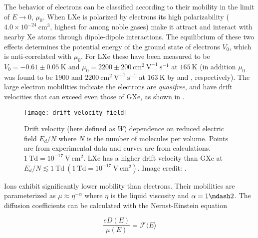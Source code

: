 The behavior of electrons can be classified according to their mobility in the limit of $E \rightarrow 0$, $\mu_0$.  When LXe is
polarized by electrons its high polarizability ($4.0 \times 10^{-24}\ \mathrm{cm^3}$, highest for among noble gases) make it
attract \electron and interact with nearby Xe atoms through dipole-dipole interactions.  The equilibrium of these two effects
determines the potential energy of the ground state of electrons $V_0$, which is anti-correlated with $\mu_0$.  For LXe these have
been measured to be $V_0 = -0.61 \pm 0.05\ \mathrm{K}$  and $\mu_0 = 2200 \pm 200\ \mathrm{cm^2\ V^{-1}\ s^{-1}}$
 at $165\ \mathrm{K}$ (in addition $\mu_0$ was found to be $1900$ and $2200\ \mathrm{cm^2\ V^{-1}\ s^{-1}}$
at $163\ \mathrm{K}$ by  and , respectively).  The large electron mobilities indicate the
electrons are \textit{quasifree}, and have drift velocities that can exceed even those of GXe, as shown in
.

\begin{figure}
\centering
\texttt{[image: drift\_velocity\_field]}
\caption[Drift velocity (here defined as $W$) dependence on reduced electric field $E_d/N$ where $N$ is the number of molecules per
volume.]{Drift velocity (here defined as $W$) dependence on reduced electric field $E_d/N$ where $N$ is the number of molecules per
volume.  Points are from experimental data  and curves are from
calculations.  $1\ \mathrm{Td} = 10^{-17}\ \mathrm{V\ cm^2}$.  LXe has a higher drift velocity than GXe at
$E_d/N \lesssim 1\ \mathrm{Td}\ (1\ \mathrm{Td} = 10^{-17}\ \mathrm{V\ cm^2})$.  Image credit: .}
\label{fig:importance_procedure_effects_charge_drift_velocity}
\end{figure}

Ions exhibit significantly lower mobility than electrons.  Their mobilities are parameterized as $\mu \approx \eta^{-\alpha}$ where
$\eta$ is the liquid viscosity and $\alpha = 1 \mdash 2$.  The diffusion coefficients can be calculated with the Nernst-Einstein equation

\vspace{-10pt}

\begin{equation}
\frac{e D(E)}{\mu (E)} = \mathcal{F} \langle E \rangle
\end{equation}

